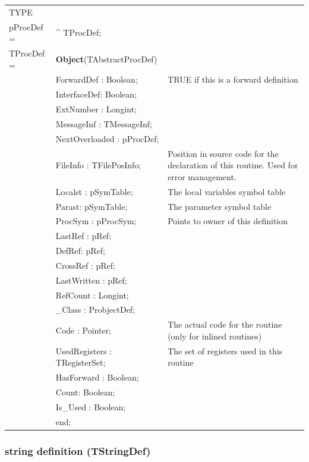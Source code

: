 \documentclass [a4paper,12pt]{article}
\begin{document}
\begin{tabular*}{6.5in}{|l@{\extracolsep{\fill}}lp{7.8cm}|}
\hline
\textsf{TYPE} & &  \\
\xspace pProcDef = & \^{}  TProcDef; & \\
\xspace \textsf{TProcDef} = & \textbf{Object}(TAbstractProcDef) & \\
&\textsf{ForwardDef : Boolean;}& TRUE if this is a forward definition \\
&\textsf{InterfaceDef: Boolean;}	&  \\
&\textsf{ExtNumber : Longint;}		&  \\
&\textsf{MessageInf : TMessageInf;}	&  \\
&\textsf{NextOverloaded : pProcDef;}	&  \\
&\textsf{FileInfo : TFilePosInfo;}	&
	Position in source code for the declaration of this routine. Used
	for error management. \\
&\textsf{Localst : pSymTable;}		& The local variables symbol table \\
&\textsf{Parast: pSymTable;}& The parameter symbol table \\
&\textsf{ProcSym : pProcSym;}& Points to owner of this definition \\
&\textsf{LastRef : pRef;}&  \\
&\textsf{DefRef: pRef;}&  \\
&\textsf{CrossRef : pRef;}&  \\
&\textsf{LastWritten : pRef;}&  \\
&\textsf{RefCount : Longint;}&  \\
&\textsf{{\_}Class : ProbjectDef;}&  \\
&\textsf{Code : Pointer;}&
	The actual code for the routine (only for inlined routines) \\
&\textsf{UsedRegisters : TRegisterSet;}&
	The set of registers used in this routine \\
&\textsf{HasForward : Boolean;}&  \\
&\textsf{Count: Boolean;}&  \\
&\textsf{Is{\_}Used : Boolean;}&  \\
&\textsf{end;}&  \\
\hline
\end{tabular*}

\subsubsection{string definition (TStringDef)}
\label{subsubsec:string}
\end{document}
